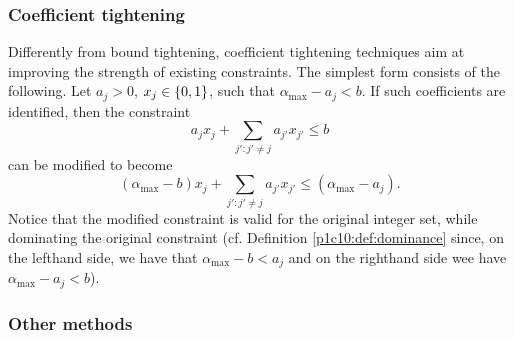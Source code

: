 \subsubsection{Coefficient tightening}

Differently from bound tightening, coefficient tightening techniques aim at improving the strength of existing constraints. The simplest form consists of the following. Let $a_j > 0$, $x_j \in \left\{ 0,1 \right \}$, such that $\alpha_{\text{max}} - a_j < b$. If such coefficients are identified, then the constraint 
%
\begin{equation*}
	a_jx_j + \sum_{j' : j' \neq j} a_{j'}x_{j'}\leq b
\end{equation*}
%
can be modified to become
%
\begin{equation*}
	(\alpha_{\text{max}} - b)x_j + \sum_{j' : j' \neq j} a_{j'}x_{j'} \leq (\alpha_{\text{max}} - a_j).
\end{equation*}
%
Notice that the modified constraint is valid for the original integer set, while dominating the original constraint (cf. Definition \ref{p1c10:def:dominance} since, on the lefthand side, we have that $\alpha_{\text{max}} - b < a_j$ and on the righthand side wee have $\alpha_{\text{max}} - a_j < b$).


\subsubsection{Other methods}

